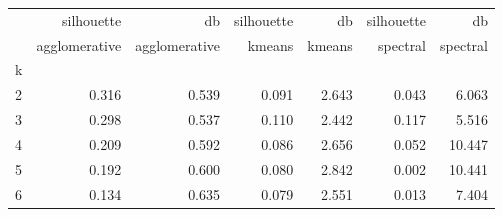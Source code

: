 \begin{tabular}{lrrrrrr}
\toprule
{} &    silhouette &            db & silhouette &     db & silhouette &       db \\
{} & agglomerative & agglomerative &     kmeans & kmeans &   spectral & spectral \\
k &               &               &            &        &            &          \\
\midrule
2 &         0.316 &         0.539 &      0.091 &  2.643 &      0.043 &    6.063 \\
3 &         0.298 &         0.537 &      0.110 &  2.442 &      0.117 &    5.516 \\
4 &         0.209 &         0.592 &      0.086 &  2.656 &      0.052 &   10.447 \\
5 &         0.192 &         0.600 &      0.080 &  2.842 &      0.002 &   10.441 \\
6 &         0.134 &         0.635 &      0.079 &  2.551 &      0.013 &    7.404 \\
\bottomrule
\end{tabular}
